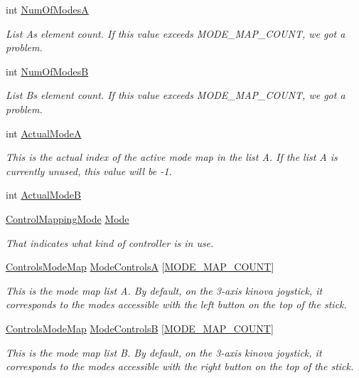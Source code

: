 \begin{DoxyCompactItemize}
\item 
int \hyperlink{struct_control_mapping_ab82579c661e09b8a7d4e5bae10823b47}{Num\+Of\+ModesA}
\begin{DoxyCompactList}\small\item\em List A\textquotesingle{}s element count. If this value exceeds M\+O\+D\+E\+\_\+\+M\+A\+P\+\_\+\+C\+O\+U\+NT, we got a problem. \end{DoxyCompactList}\item 
int \hyperlink{struct_control_mapping_a07198eba22a0b4557eaec7ce5973a1c5}{Num\+Of\+ModesB}
\begin{DoxyCompactList}\small\item\em List B\textquotesingle{}s element count. If this value exceeds M\+O\+D\+E\+\_\+\+M\+A\+P\+\_\+\+C\+O\+U\+NT, we got a problem. \end{DoxyCompactList}\item 
int \hyperlink{struct_control_mapping_a12722cd1ab9c15c8fee5b6722d9f9f69}{Actual\+ModeA}
\begin{DoxyCompactList}\small\item\em This is the actual index of the active mode map in the list A. If the list A is currently unused, this value will be -\/1. \end{DoxyCompactList}\item 
int \hyperlink{struct_control_mapping_a9c3fea40ada452fa35d9d12d003eb867}{Actual\+ModeB}
\item 
\hyperlink{_kinova_types_8h_a0cbbbff9819ea9faabb8810022aefec3}{Control\+Mapping\+Mode} \hyperlink{struct_control_mapping_a293caba4b861368460f71e13fff5b523}{Mode}
\begin{DoxyCompactList}\small\item\em That indicates what kind of controller is in use. \end{DoxyCompactList}\item 
\hyperlink{struct_controls_mode_map}{Controls\+Mode\+Map} \hyperlink{struct_control_mapping_acb57ae41b95f7beef041aa311c040a98}{Mode\+ControlsA} \mbox{[}\hyperlink{_kinova_types_8h_ae65b2d54c897b15b974b833eec59a7a2}{M\+O\+D\+E\+\_\+\+M\+A\+P\+\_\+\+C\+O\+U\+NT}\mbox{]}
\begin{DoxyCompactList}\small\item\em This is the mode map list A. By default, on the 3-\/axis kinova joystick, it corresponds to the modes accessible with the left button on the top of the stick. \end{DoxyCompactList}\item 
\hyperlink{struct_controls_mode_map}{Controls\+Mode\+Map} \hyperlink{struct_control_mapping_a068cd90e7e56554639f2a24d96f6e925}{Mode\+ControlsB} \mbox{[}\hyperlink{_kinova_types_8h_ae65b2d54c897b15b974b833eec59a7a2}{M\+O\+D\+E\+\_\+\+M\+A\+P\+\_\+\+C\+O\+U\+NT}\mbox{]}
\begin{DoxyCompactList}\small\item\em This is the mode map list B. By default, on the 3-\/axis kinova joystick, it corresponds to the modes accessible with the right button on the top of the stick. \end{DoxyCompactList}\end{DoxyCompactItemize}


